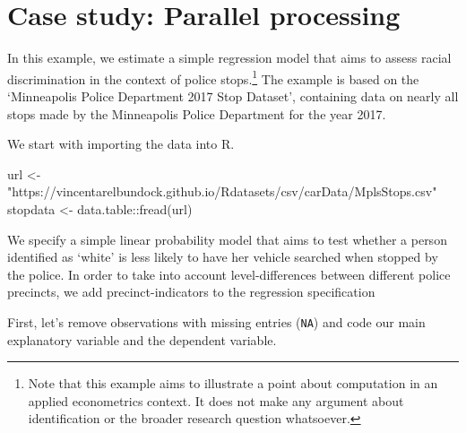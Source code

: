 \documentclass[
  12pt,
]{style/krantz}
\newenvironment{Shaded}{\begin{snugshade}}{\end{snugshade}}
\newcommand{\CommentTok}[1]{\textcolor[rgb]{0.56,0.35,0.01}{\textit{#1}}}
\newcommand{\DecValTok}[1]{\textcolor[rgb]{0.00,0.00,0.81}{#1}}
\newcommand{\FunctionTok}[1]{\textcolor[rgb]{0.00,0.00,0.00}{#1}}
\newcommand{\NormalTok}[1]{#1}
\newcommand{\OtherTok}[1]{\textcolor[rgb]{0.56,0.35,0.01}{#1}}
\newcommand{\SpecialCharTok}[1]{\textcolor[rgb]{0.00,0.00,0.00}{#1}}
\newcommand{\StringTok}[1]{\textcolor[rgb]{0.31,0.60,0.02}{#1}}
\begin{document}
\hypertarget{case-study-parallel-processing}{%
\section{Case study: Parallel processing}\label{case-study-parallel-processing}}

In this example, we estimate a simple regression model that aims to assess racial discrimination in the context of police stops.\footnote{Note that this example aims to illustrate a point about computation in an applied econometrics context. It does not make any argument about identification or the broader research question whatsoever.} The example is based on the `Minneapolis Police Department 2017 Stop Dataset', containing data on nearly all stops made by the Minneapolis Police Department for the year 2017.

We start with importing the data into R.

\begin{Shaded}
\begin{Highlighting}[]
\NormalTok{url }\OtherTok{\textless{}{-}} \StringTok{"https://vincentarelbundock.github.io/Rdatasets/csv/carData/MplsStops.csv"}
\NormalTok{stopdata }\OtherTok{\textless{}{-}}\NormalTok{ data.table}\SpecialCharTok{::}\FunctionTok{fread}\NormalTok{(url) }
\end{Highlighting}
\end{Shaded}

We specify a simple linear probability model that aims to test whether a person identified as `white' is less likely to have her vehicle searched when stopped by the police. In order to take into account level-differences between different police precincts, we add precinct-indicators to the regression specification

First, let's remove observations with missing entries (\texttt{NA}) and code our main explanatory variable and the dependent variable.

\begin{Shaded}
\end{Shaded}
\end{document}
